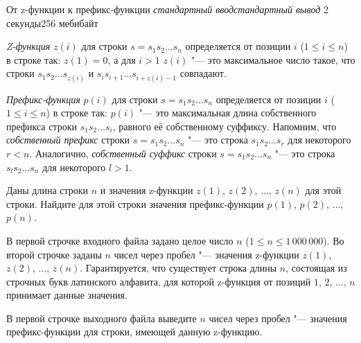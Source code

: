 
\begin{problem}{От z-функции к префикс-функции}
{\textsl{стандартный ввод}}{\textsl{стандартный вывод}}
{2 секунды}{256 мебибайт}{}

\textit{Z-функция} $z (i)$ для строки $s = s_1 s_2 \ldots s_n$
определяется от позиции $i$ ($1 \le i \le n$) в строке так:
$z (1) = 0$, а для $i > 1$ $z (i)$ "--- это максимальное число такое,
что строки $s_1 s_2 \ldots s_{z (i)}$
и $s_i s_{i + 1} \ldots s_{i + z (i) - 1}$ совпадают.

\textit{Префикс-функция} $p (i)$ для строки $s = s_1 s_2 \ldots s_n$
определяется от позиции $i$ ($1 \le i \le n$) в строке так:
$p (i)$ "--- это максимальная длина собственного префикса строки
$s_1 s_2 \ldots s_i$, равного её собственному суффиксу.
Напомним, что \textit{собственный префикс} строки $s = s_1 s_2 \ldots s_n$
"--- это строка $s_1 s_2 \ldots s_r$ для некоторого $r < n$.
Аналогично, \textit{собственный суффикс} строки $s = s_1 s_2 \ldots s_n$
"--- это строка $s_l s_2 \ldots s_n$ для некоторого $l > 1$.

Даны длина строки $n$ и значения z-функции
$z (1)$, $z (2)$, $\ldots$, $z (n)$ для этой строки.
Найдите для этой строки значения префикс-функции
$p (1)$, $p (2)$, $\ldots$, $p (n)$.

\InputFile

В первой строчке входного файла задано целое число $n$
($1 \le n \le 1\,000\,000$).
Во второй строчке заданы $n$ чисел через пробел "--- значения z-функции
$z (1)$, $z (2)$, $\ldots$, $z (n)$.
Гарантируется, что существует строка длины $n$, состоящая
из строчных букв латинского алфавита, для которой z-функция
от позиций $1$, $2$, $\ldots$, $n$ принимает данные значения.

\OutputFile

В первой строчке выходного файла выведите $n$ чисел через пробел "---
значения префикс-функции для строки, имеющей данную z-функцию.

\Examples

\begin{example}
%
%
%
\end{example}

\end{problem}
